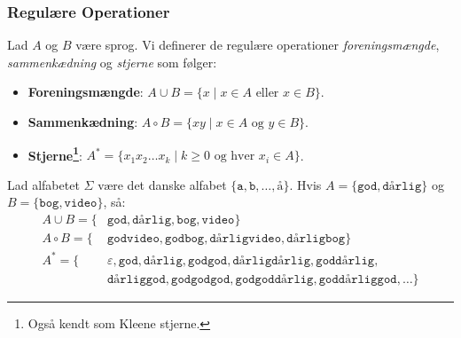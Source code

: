\begin{frame}
	\frametitle{Regulære Operationer}

	\begin{definition}
		Lad $A$ og $B$ være sprog. Vi definerer de regulære operationer \textit{foreningsmængde}, \textit{sammenkædning} og \textit{stjerne} som følger:
		\begin{itemize}
			\item \textbf{Foreningsmængde}: $A \cup B = \{x \mid x \in A \text{ eller } x \in B\}$.
			\item \textbf{Sammenkædning}: $A \circ B = \{xy \mid x \in A \text{ og } y \in B\}$.
			\item \textbf{Stjerne\footnote{Også kendt som Kleene stjerne.}}: $A^{*} = \{x_{1}x_{2} \ldots x_{k} \mid k \ge 0 \text{ og hver } x_{i} \in A\}$.
		\end{itemize}
	\end{definition}


	\begin{example}
		Lad alfabetet $\Sigma$ være det danske alfabet $\{\mathtt{a, b, \ldots, å}\}$. Hvis $A = \{\mathtt{god, dårlig}\}$ og $B = \{\mathtt{bog, video}\}$, så:
		\begin{equation*}
			\begin{split}
				A \cup B = \{  & \mathtt{god, dårlig, bog, video}\}                                  \\
				A \circ B = \{ & \mathtt{godvideo, godbog, dårligvideo, dårligbog}\}                 \\
				A^{*} = \{     & \varepsilon, \mathtt{god, dårlig, godgod, dårligdårlig, goddårlig,} \\
				               & \mathtt{dårliggod, godgodgod, godgoddårlig, goddårliggod, \ldots}\}
			\end{split}
		\end{equation*}
	\end{example}
\end{frame}

